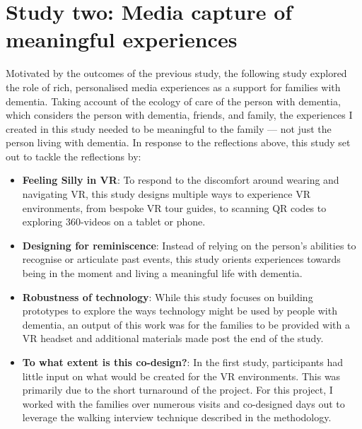 \section{Study two: Media capture of meaningful experiences}
\label{studyTwo}
Motivated by the outcomes of the previous study, the following study explored the role of rich, personalised media experiences as a support for families with dementia. Taking account of the ecology of care of the person with dementia, which considers the person with dementia, friends, and family, the experiences I created in this study needed to be meaningful to the family — not just the person living with dementia. In response to the reflections above, this study set out to tackle the reflections by:

\begin{itemize}
    \item \textbf{Feeling Silly in VR}: To respond to the discomfort around wearing and navigating VR, this study designs multiple ways to experience VR environments, from bespoke VR tour guides, to scanning QR codes to exploring 360-videos on a tablet or phone. 
    
    \item \textbf{Designing for reminiscence}: Instead of relying on the person's abilities to recognise or articulate past events, this study orients experiences towards being in the moment and living a meaningful life with dementia.

    \item \textbf{Robustness of technology}: While this study focuses on building prototypes to explore the ways technology might be used by people with dementia, an output of this work was for the families to be provided with a VR headset and additional materials made post the end of the study.

    \item \textbf{To what extent is this co-design?}: In the first study, participants had little input on what would be created for the VR environments. This was primarily due to the short turnaround of the project. For this project, I worked with the families over numerous visits and co-designed days out to leverage the walking interview technique described in the methodology.
\end{itemize}

